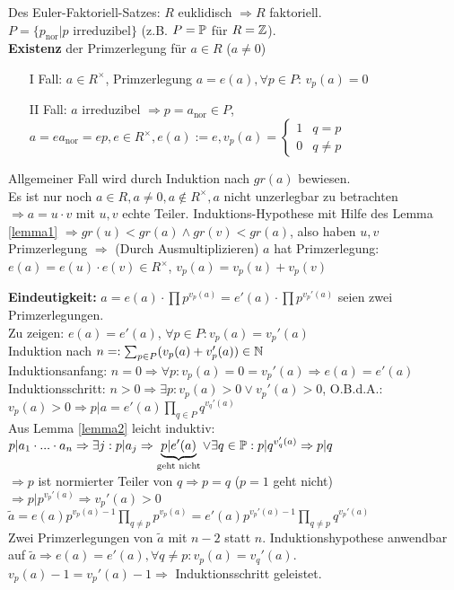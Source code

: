 \documentclass[a4paper,DIV15,BCOR12mm]{article}
\begin{document}
\begin{beweis}
Des Euler-Faktoriell-Satzes: $R$ euklidisch $\Rightarrow R$ faktoriell.\\
$P = \{p_{\text{nor}} | p \text{ irreduzibel}\}$ (z.B. $P = \mathbb{P}$ für $R = \mathbb{Z}$).\\
\textbf{Existenz} der Primzerlegung für $a\in R$ ($a \ne 0$)
\begin{itemize}
\item[I] Fall: $a \in R^\times$, Primzerlegung $a = e(a), \forall p \in P$: $v_p(a) = 0$
\item[II] Fall: $a$ irreduzibel $\Rightarrow p = a_{\text{nor}} \in P$, $a = ea_{\text{nor}} = ep, e \in R^\times, e(a) := e, v_p(a) = \begin{cases}1 & q = p\\0 & q \not= p\end{cases}$
\end{itemize}
Allgemeiner Fall wird durch Induktion nach $gr(a)$ bewiesen.\\
Es ist nur noch $a \in R, a \not= 0, a \not\in R^\times, a$ nicht
unzerlegbar zu betrachten $\Rightarrow a = u \cdot v$ mit $u,v$
echte Teiler. Induktions-Hypothese mit Hilfe des Lemma \ref{lemma1}
$\Rightarrow gr(u) < gr(a) \wedge gr(v) < gr(a)$, also haben $u,v$
Primzerlegung $\Rightarrow$ (Durch Ausmultiplizieren) $a$ hat
Primzerlegung: $e(a) = e(u) \cdot e(v) \in R^\times$, $v_p(a) =
v_p(u) + v_p(v)$

\textbf{Eindeutigkeit:}
$a = e(a) \cdot \prod p^{v_p(a)} = e'(a) \cdot \prod p^{v_p'(a)}$ seien zwei Primzerlegungen.\\
Zu zeigen: $e(a) = e'(a)$, $\forall p \in P: v_p(a) = v_p'(a)$\\
Induktion nach $n =: \sum_{p \in P}(v_p(a) + v_p'(a)) \in \mathbb{N}$\\
Induktionsanfang: $n=0 \Rightarrow \forall p: v_p(a) = 0 = v_p'(a) \Rightarrow e(a) = e'(a)$\\
Induktionsschritt: $n > 0 \Rightarrow \exists p: v_p(a) > 0 \vee v_p'(a) > 0$, O.B.d.A.: $v_p(a) > 0 \Rightarrow p|a = e'(a) \prod_{q\in P}q^{v_q'(a)}$\\
Aus Lemma \ref{lemma2} leicht induktiv: $p|a_1 \cdot ... \cdot a_n \Rightarrow \exists j: p | a_j \Rightarrow \underbrace{p|e'(a)}_{\text{geht nicht}} \vee \exists q\in\mathbb{P}: p|q^{v_q'(a)} \Rightarrow p|q$\\
$\Rightarrow p$ ist normierter Teiler von $q \Rightarrow p = q$ ($p = 1$ geht nicht) $\Rightarrow p | p^{v_p'(a)} \Rightarrow v_p'(a) > 0$\\
$\tilde{a} = e(a) p^{v_p(a)-1} \prod_{q \not= p}p^{v_p(a)} = e'(a)p^{v_p'(a)-1} \prod_{q \not= p}q^{v_p'(a)}$\\
Zwei Primzerlegungen von $\tilde{a}$ mit $n-2$ statt $n$.
Induktionshypothese anwendbar auf $\tilde{a} \Rightarrow e(a) =
e'(a), \forall q\not= p: v_p(a) = v_q'(a)$. $v_p(a) -1 = v_p'(a) -1
\Rightarrow$ Induktionsschritt geleistet.
\end{beweis}
\end{document}
